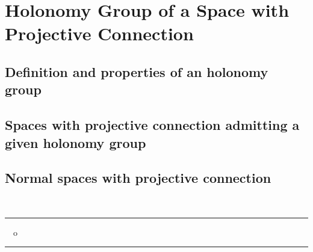 
\chapter{Holonomy Group of a Space with Projective Connection}


\section{Definition and properties of an holonomy group}
             
%
%
%
%
%
%
%
%


\section{Spaces with projective connection admitting a given holonomy group}

%
%
%
%


\section{Normal spaces with projective connection}

%
%


\ \\[.5cm]
\begin{center}
\rule{2cm}{.03cm} \ \ o \ \ \rule{2cm}{.03cm} 
\end{center} 


%





























